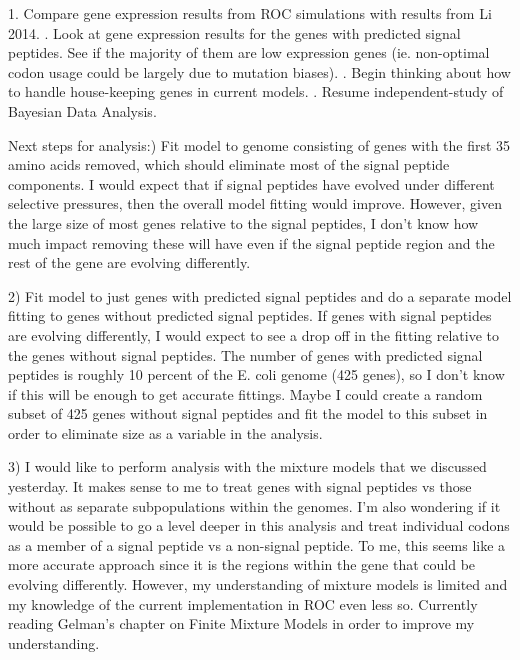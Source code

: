 \documentclass[11pt]{labbook}
\begin{document}
1. Compare gene expression results from ROC simulations with results from Li 2014.
. Look at gene expression results for the genes with predicted signal peptides. See if the majority of them are low expression genes (ie. non-optimal codon usage could be largely due to mutation biases).
. Begin thinking about how to handle house-keeping genes in current models.
. Resume independent-study of Bayesian Data Analysis.


Next steps for analysis:) Fit model to genome consisting of genes with the first 35 amino acids removed, which should eliminate most of the signal peptide components. I would expect that if signal peptides have evolved under different selective pressures, then the overall model fitting would improve. However, given the large size of most genes relative to the signal peptides, I don't know how much impact removing these will have even if the signal peptide region and the rest of the gene are evolving differently. 

2) Fit model to just genes with predicted signal peptides and do a separate model fitting to genes without predicted signal peptides. If genes with signal peptides are evolving differently, I would expect to see a drop off in the fitting relative to the genes without signal peptides. The number of genes with predicted signal peptides is roughly 10 percent of the E. coli genome (425 genes), so I don't know if this will be enough to get accurate fittings. Maybe I could create a random subset of 425 genes without signal peptides and fit the model to this subset in order to eliminate size as a variable in the analysis.

3) I would like to perform analysis with the mixture models that we discussed yesterday. It makes sense to me to treat genes with signal peptides vs those without as separate subpopulations within the genomes. I'm also wondering if it would be possible to go a level deeper in this analysis and treat individual codons as a member of a signal peptide vs a non-signal peptide. To me, this seems like a more accurate approach since it is the regions within the gene that could be evolving differently. However, my understanding of mixture models is limited and my knowledge of the current implementation in ROC even less so. Currently reading Gelman's chapter on Finite Mixture Models in order to improve my understanding. 
\end{document}
